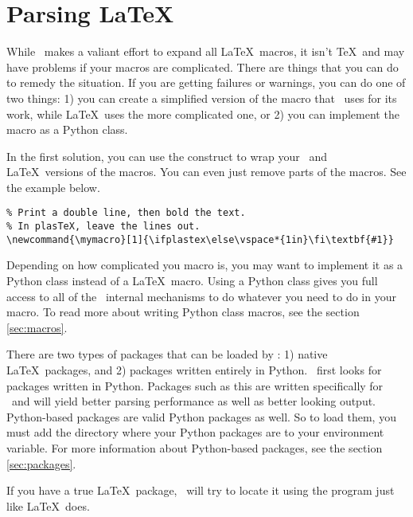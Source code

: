 
\section{Parsing \LaTeX}


While \plasTeX\ makes a valiant effort 
to expand all \LaTeX\ macros, it isn't \TeX\ and may have problems if 
your macros are complicated.  There are things that you can do to remedy the 
situation.  If you are getting failures or warnings, you can do one of two 
things: 1) you can create a simplified version of the macro that \plasTeX\ uses
for its work, while \LaTeX\ uses the more complicated one, or 2) you
can implement the macro as a Python class. 

In the first solution, you can use the  construct to wrap
your \plasTeX\ and \LaTeX\ versions of the macros.  You can even just remove 
parts of the macros.  See the example below.

\begin{verbatim}
% Print a double line, then bold the text.  
% In plasTeX, leave the lines out.
\newcommand{\mymacro}[1]{\ifplastex\else\vspace*{1in}\fi\textbf{#1}}
\end{verbatim}

Depending on how complicated you macro is, you may want to implement it
as a Python class instead of a \LaTeX\ macro.  Using a Python class 
gives you full access to all of the \plasTeX\ internal mechanisms to 
do whatever you need to do in your macro.  To read more about writing
Python class macros, see the section \ref{sec:macros}.


There are two types of packages that can be loaded by \plasTeX: 1) native
\LaTeX\ packages, and 2) packages written entirely in Python.  \plasTeX\
first looks for packages written in Python.  Packages such as this are
written specifically for \plasTeX\ and will yield better parsing performance
as well as better looking output.  Python-based packages are valid Python
packages as well.  So to load them, you must add the directory where
your Python packages are to your \envvar{PYTHONPATH} environment variable.
For more information about Python-based packages, see the section
\ref{sec:packages}.

If you have a true \LaTeX\ package, \plasTeX\ will try to locate it using
the \program{kpsewhich} program just like \LaTeX\ does.
